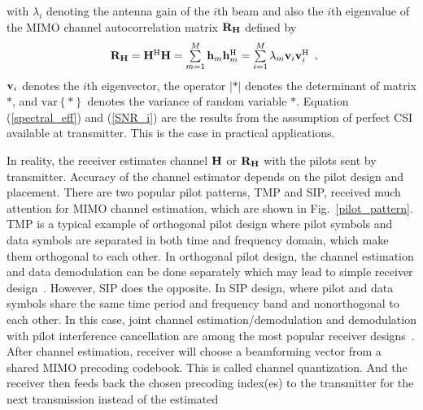 \documentclass[10pt,fleqn, twocolumn]{IEEEtran}
\newcommand{\bh}{{\bf h}}
\newcommand{\bH}{{\bf H}}
\newcommand{\bv}{{\bf v}}
\newcommand{\bR}{{\bf R}}
\begin{document}
\noindent with $\lambda_{i}$ denoting the antenna gain of the
$i$th beam and also the $i$th eigenvalue of the MIMO channel
autocorrelation matrix $\bR_{\bH}$ defined by
\begin{equation}
\begin{array}{l}
\bR_{\bH}=\bH^{\rm H}\bH=\sum\limits_{m=1}^{M}\bh_{m}\bh_{m}^{\rm
H}=\sum\limits_{i=1}^{M}\lambda_{m}\bv_{i}\bv_{i}^{\rm H}
\end{array},\label{R_h}
\end{equation}
\noindent $\bv_{i}$ denotes the $i$th eigenvector, the operator
$\left|\ast\right|$ denotes the determinant of matrix $\ast$, and
$\mbox{var}\left\{\ast\right\}$ denotes the variance of random
variable $\ast$. Equation (\ref{spectral_eff}) and (\ref{SNR_i})
are the results from the assumption of perfect CSI available at
transmitter. This is the case in practical applications.
\begin{figure}
\end{figure}
In reality, the receiver estimates channel $\bH$ or $\bR_{\bH}$
with the pilots sent by transmitter. Accuracy of the channel
estimator depends on the pilot design and placement. There are two
popular pilot patterns, TMP and SIP, received much attention for
MIMO channel estimation, which are shown in
Fig.~\ref{pilot_pattern}. TMP is a typical example of orthogonal
pilot design where pilot symbols and data symbols are separated in
both time and frequency domain, which make them orthogonal to each
other. In orthogonal pilot design, the channel estimation and data
demodulation can be done separately which may lead to simple
receiver design~\cite{Dong02}. However, SIP does the opposite. In
SIP design, where pilot and data symbols share the same time
period and frequency band and nonorthogonal to each other. In this
case, joint channel estimation/demodulation and demodulation with
pilot interference cancellation are among the most popular
receiver designs~\cite{Coldrey06}. After channel estimation,
receiver will choose a beamforming vector from a shared MIMO
precoding codebook. This is called channel quantization. And the
receiver then feeds back the chosen precoding index(es) to the
transmitter for the next transmission instead of the estimated
\end{document}
